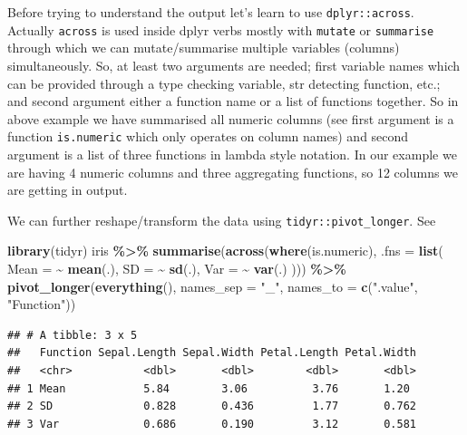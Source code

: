 \documentclass[
]{book}
\newenvironment{Shaded}{\begin{snugshade}}{\end{snugshade}}
\newcommand{\AttributeTok}[1]{\textcolor[rgb]{0.13,0.29,0.53}{#1}}
\newcommand{\FunctionTok}[1]{\textcolor[rgb]{0.13,0.29,0.53}{\textbf{#1}}}
\newcommand{\NormalTok}[1]{#1}
\newcommand{\SpecialCharTok}[1]{\textcolor[rgb]{0.81,0.36,0.00}{\textbf{#1}}}
\newcommand{\StringTok}[1]{\textcolor[rgb]{0.31,0.60,0.02}{#1}}
\begin{document}
Before trying to understand the output let's learn to use \texttt{dplyr::across}. Actually \texttt{across} is used inside dplyr verbs mostly with \texttt{mutate} or \texttt{summarise} through which we can mutate/summarise multiple variables (columns) simultaneously. So, at least two arguments are needed; first variable names which can be provided through a type checking variable, str detecting function, etc.; and second argument either a function name or a list of functions together. So in above example we have summarised all numeric columns (see first argument is a function \texttt{is.numeric} which only operates on column names) and second argument is a list of three functions in lambda style notation. In our example we are having 4 numeric columns and three aggregating functions, so 12 columns we are getting in output.

We can further reshape/transform the data using \texttt{tidyr::pivot\_longer}. See

\begin{Shaded}
\begin{Highlighting}[]
\FunctionTok{library}\NormalTok{(tidyr)}
\NormalTok{iris }\SpecialCharTok{\%\textgreater{}\%}
  \FunctionTok{summarise}\NormalTok{(}\FunctionTok{across}\NormalTok{(}\FunctionTok{where}\NormalTok{(is.numeric),}
                   \AttributeTok{.fns =} \FunctionTok{list}\NormalTok{(}
                     \AttributeTok{Mean =} \SpecialCharTok{\textasciitilde{}} \FunctionTok{mean}\NormalTok{(.),}
                     \AttributeTok{SD =} \SpecialCharTok{\textasciitilde{}} \FunctionTok{sd}\NormalTok{(.),}
                     \AttributeTok{Var =} \SpecialCharTok{\textasciitilde{}} \FunctionTok{var}\NormalTok{(.)}
\NormalTok{                   ))) }\SpecialCharTok{\%\textgreater{}\%}
  \FunctionTok{pivot\_longer}\NormalTok{(}\FunctionTok{everything}\NormalTok{(),}
               \AttributeTok{names\_sep =} \StringTok{"\_"}\NormalTok{,}
               \AttributeTok{names\_to =} \FunctionTok{c}\NormalTok{(}\StringTok{".value"}\NormalTok{, }\StringTok{"Function"}\NormalTok{))}
\end{Highlighting}
\end{Shaded}

\begin{verbatim}
## # A tibble: 3 x 5
##   Function Sepal.Length Sepal.Width Petal.Length Petal.Width
##   <chr>           <dbl>       <dbl>        <dbl>       <dbl>
## 1 Mean            5.84        3.06          3.76       1.20 
## 2 SD              0.828       0.436         1.77       0.762
## 3 Var             0.686       0.190         3.12       0.581
\end{verbatim}
\end{document}
